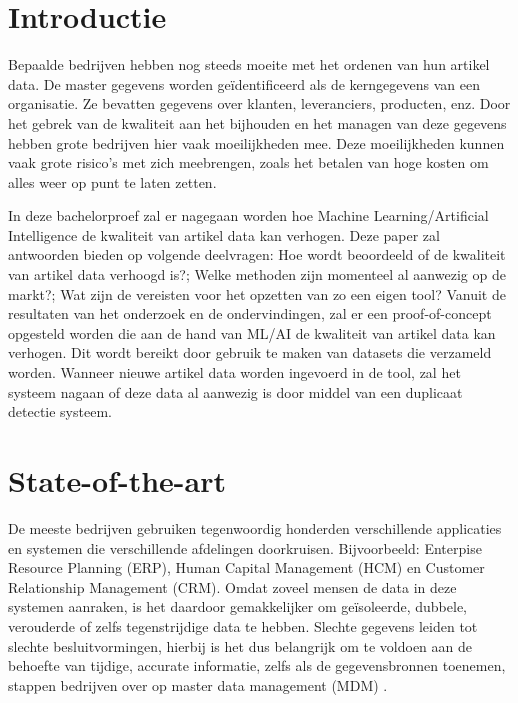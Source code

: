 
\section{Introductie}%
\label{sec:introductie}

Bepaalde bedrijven hebben nog steeds moeite met het ordenen van hun artikel data. De master gegevens worden geïdentificeerd als de kerngegevens van een organisatie. Ze bevatten gegevens over klanten, leveranciers, producten, enz. Door het gebrek van de kwaliteit aan het bijhouden en het managen van deze gegevens hebben grote bedrijven hier vaak moeilijkheden mee. Deze moeilijkheden kunnen vaak grote risico’s met zich meebrengen, zoals het betalen van hoge kosten om alles weer op punt te laten zetten. 

In deze bachelorproef zal er nagegaan worden hoe Machine Learning/Artificial Intelligence de kwaliteit van artikel data kan verhogen. Deze paper zal antwoorden bieden op volgende deelvragen: Hoe wordt beoordeeld of de kwaliteit van artikel data verhoogd is?; Welke methoden zijn momenteel al aanwezig op de markt?; Wat zijn de vereisten voor het opzetten van zo een eigen tool? Vanuit de resultaten van het onderzoek en de ondervindingen, zal er een proof-of-concept opgesteld worden die aan de hand van ML/AI de kwaliteit van artikel data kan verhogen. Dit wordt bereikt door gebruik te maken van datasets die verzameld worden. Wanneer nieuwe artikel data worden ingevoerd in de tool, zal het systeem nagaan of deze data al aanwezig is door middel van een duplicaat detectie systeem.


\section{State-of-the-art}%
\label{sec:state-of-the-art}


De meeste bedrijven gebruiken tegenwoordig honderden verschillende applicaties en systemen die verschillende afdelingen doorkruisen. Bijvoorbeeld: Enterpise Resource Planning (ERP), Human Capital Management (HCM) en Customer Relationship Management (CRM). Omdat zoveel mensen de data in deze systemen aanraken, is het daardoor gemakkelijker om geïsoleerde, dubbele, verouderde of zelfs tegenstrijdige data te hebben. Slechte gegevens leiden tot slechte besluitvormingen, hierbij is het dus belangrijk om te voldoen aan de behoefte van tijdige, accurate informatie, zelfs als de gegevensbronnen toenemen, stappen bedrijven over op master data management (MDM) \autocite{SAP}.

